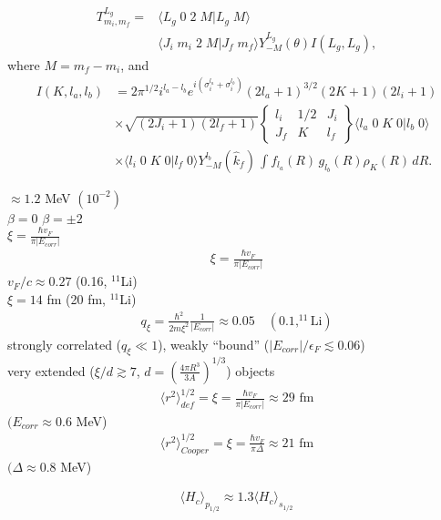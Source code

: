 \documentclass[a4paper,12pt]{book}
\numberwithin{equation}{section}
\numberwithin{figure}{section}
\numberwithin{table}{section}
\begin{document}
\begin{align}
  T^{L_g}_{m_i,m_f}=&\langle L_g\;0\;2\;M|L_g\;M\rangle\\
  &\langle J_i\;m_i\;2\;M|J_f\;m_f\rangle Y^{L_g}_{-M} (\theta) I(L_g,L_g),
\end{align}
where $M=m_f-m_i$, and
\begin{align}\label{eq50}
\nonumber I(K,l_a,l_b)&=2\pi^{1/2}i^{l_a-l_b}e^{i(\sigma_i^{l_a}+\sigma_i^{l_b})}(2l_a+1)^{3/2}(2K+1)(2l_i+1)\\&\times \nonumber\sqrt{(2J_i+1)(2l_f+1)}\left\{\begin{array}{ccc}
 l_i&1/2  & J_i \\ 
 J_f&K  & l_f
\end{array} \right\}\langle l_a\;0\;K\;0|l_b\;0\rangle\\
&\times\langle l_i\;0\;K\;0|l_f\;0\rangle Y^{l_b}_{-M} (\hat k_f)\,\int f_{l_a} (R)\,g_{l_b}  (R)\rho_K(R)\,dR.
\end{align}

$\approx 1.2 $ MeV $(10^{-2})$\\
$\beta=0$  $\beta=\pm2$\\
$\xi=\frac{\hbar v_F}{\pi|E_{corr}|}$
\begin{align}\label{eq50}
\xi=\frac{\hbar v_F}{\pi|E_{corr}|}
\end{align}
$v_F/c\approx 0.27$  (0.16, $^{11}$Li)\\
$\xi=14$ fm (20 fm, $^{11}$Li)
\begin{align}\label{eq50}
q_\xi=\frac{\hbar^2}{2m\xi^2}\frac{1}{|E_{corr}|}\approx0.05\quad (0.1, ^{11}\text{Li})
\end{align}
strongly correlated ($q_\xi\ll1$), weakly ``bound'' ($|E_{corr}|/\epsilon_F\lesssim0.06$)\\
very extended ($\xi/d\gtrsim7$, $d=\left(\frac{4\pi R^3}{3A}\right)^{1/3}$) objects\\
\begin{align}\label{eq50}
\langle r^2\rangle^{1/2}_{def}=\xi=\frac{\hbar v_F}{\pi|E_{corr}|}\approx 29\text{ fm}
\end{align}
$(E_{corr}\approx 0.6$ MeV)
\begin{align}\label{eq50}
\langle r^2\rangle^{1/2}_{Cooper}=\xi=\frac{\hbar v_F}{\pi\Delta}\approx 21\text{ fm}
\end{align}
$(\Delta\approx 0.8$ MeV)


\begin{align}\label{eq50}
\langle H_c\rangle_{p_{1/2}}\approx 1.3\langle H_c\rangle_{s_{1/2}}
\end{align}
\end{document}
